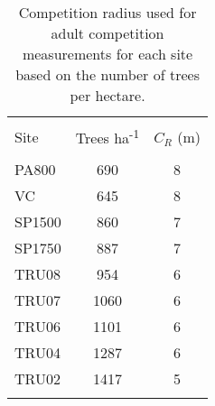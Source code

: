
\begin{table}[!htbp] \centering 
  \caption{Competition radius used for adult competition measurements for each site based on the number of trees per hectare.} 
  \label{comp_radius} 
\begin{tabular}{@{\extracolsep{5pt}} lS[table-format=3.2]S[table-format=3.2]} 
\\[-1.8ex]\hline 
\hline \\[-1.8ex] 
{Site} & {Trees ha\textsuperscript{-1}} & {$C_R$ (m)} \\
\hline \\[-1.8ex] 
PA800 & 690 & 8 \\ 
VC & 645 & 8 \\ 
SP1500 & 860 & 7 \\ 
SP1750 & 887 & 7 \\ 
TRU08 & 954 & 6 \\ 
TRU07 & 1060 & 6 \\ 
TRU06 & 1101 & 6 \\ 
TRU04 & 1287 & 6 \\ 
TRU02 & 1417 & 5 \\ 
\hline \\[-1.8ex] 
\end{tabular} 
\end{table} 
